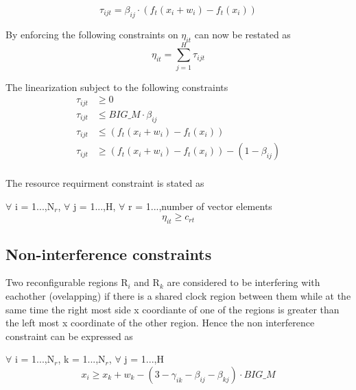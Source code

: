 \begin{equation}
\tau_{ijt} = \beta_{ij} \cdot (f_t(x_i+w_i) - f_t(x_i))
\end{equation}

\hfill

By enforcing the following constraints on $\eta_{it}$ can now be restated as 
\begin{equation}
\label{form:eq:4}
\eta_{it} = \sum_{j=1}^{H} \tau_{ijt}
\end{equation}

The linearization 
subject to the following constraints 
\begin{equation}
\begin{split}
\tau_{ijt} & \geq 0 \\
\tau_{ijt} & \leq BIG\_M \cdot \beta_{ij} \\ 
\tau_{ijt} & \leq (f_t(x_i+w_i) - f_t(x_i)) \\
\tau_{ijt} & \geq (f_t(x_i+w_i) - f_t(x_i)) - (1 - \beta_{ij}) \\
\end{split}
\end{equation}

The resource requirment constraint is stated as \\

\begin{constraint}
$\forall$ i = 1...,N$_r$, $\forall$ j = 1...,H, $\forall$ r = 1...,number of vector elements
\begin{equation}
\eta_{it} \geq c_{rt}
\end{equation}
\end{constraint}

\subsection{\textbf{Non-interference constraints}}
Two reconfigurable regions R$_i$ and R$_k$ are considered to be interfering with eachother (ovelapping) if there is a shared clock region between them while at the same time the right most side x coordiante of one of the regions is greater than the left most x coordinate of the other region. Hence the non interference constraint can be expressed as

\begin{constraint}
$\forall$ i = 1...,N$_r$, k = 1...,N$_r$, $\forall$ j = 1...,H
\begin{equation}
x_i \geq x_k + w_k - (3 - \gamma_{ik} - \beta_{ij} - \beta_{kj}) \cdot BIG\_M
\end{equation}
\end{constraint}

